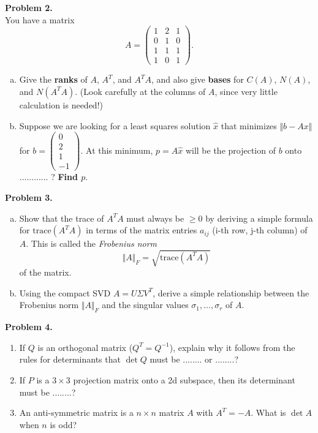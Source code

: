 \documentclass[11pt]{article}
\begin{document}
\noindent \textbf{Problem 2.}\\
You have a matrix
$$A = \begin{pmatrix} 1 & 2 & 1 \\ 0 & 1 & 0 \\ 1 & 1 & 1 \\ 1 & 0 & 1 \end{pmatrix}.$$
\begin{enumerate}[(a)]
\item Give the \textbf{ranks} of $A$, $A^T$, and $A^TA$, and also give \textbf{bases} for $C(A)$, $N(A)$, and $N(A^TA)$. (Look carefully at the columns of $A$, since very little calculation is needed!)
\item Suppose we are looking for a least squares solution $\hat{x}$ that minimizes $\Vert b- Ax\Vert$ for $b=\begin{pmatrix} 0 \\ 2 \\ 1 \\ -1 \end{pmatrix}$. At this minimum, $p=A\hat{x}$ will be the projection of $b$ onto ............ ? \textbf{Find $p$}.
\end{enumerate}

\newpage 

\noindent \textbf{Problem 3.}\\
\begin{enumerate}[(a)]
\item Show that the trace of $A^T A$ must always be $\ge 0$ by deriving a simple formula for $\mbox{trace}(A^T A)$ in terms of the matrix entries $a_{ij}$ (i-th row, j-th column) of $A$.  This is called the \emph{Frobenius norm} $$\Vert A \Vert_F = \sqrt{\mbox{trace}(A^T A)}$$ of the matrix.
\item Using the compact SVD $A = U\Sigma V^T$, derive a simple relationship between the Frobenius norm $\Vert A \Vert_F$ and the singular values $\sigma_1, \ldots, \sigma_r$ of $A$.  
\end{enumerate}

\vskip 200pt

\noindent \textbf{Problem 4.}\\
\begin{enumerate}
\item If $Q$ is an orthogonal matrix ($Q^T = Q^{-1}$), explain why it follows from the rules for determinants that $\det Q$ must be ........ or ........?
\item If $P$ is a $3\times 3$ projection matrix onto a 2d subspace, then its determinant must be ........?
\item An anti-symmetric matrix is a $n\times n$ matrix $A$ with $A^T=-A$. What is $\det A$ when $n$ is odd? 
\end{enumerate}
\end{document}
